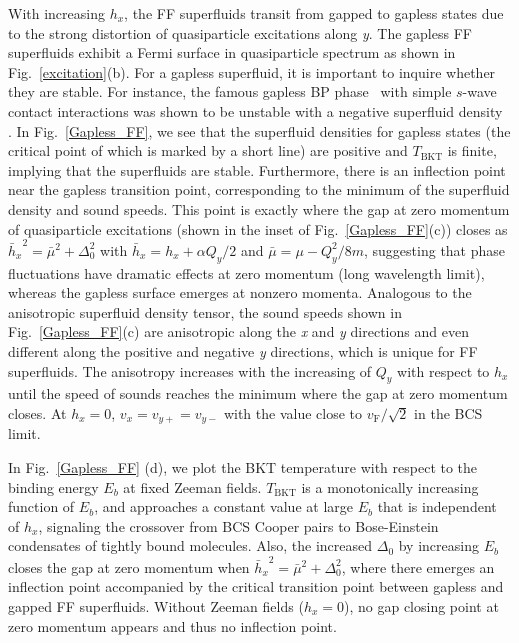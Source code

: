 \documentclass[prl,aps,twocolumn,showpacs, floatfix]{revtex4}
\begin{document}
With increasing $h_{x}$, the FF superfluids transit from gapped to gapless
states \cite%
{FanWu2013PRL,LinDongArx,Yong2014PRL,MGong2014PRB,YGao2014arXiv,Hu2014arXiv}
due to the strong distortion of quasiparticle excitations along \textit{y}.
The gapless FF superfluids exhibit a Fermi surface in quasiparticle spectrum
as shown in Fig.~\ref{excitation}(b). For a gapless superfluid, it is
important to inquire whether they are stable. For instance, the famous
gapless BP phase~\cite{Vincent2003PRL} with simple $s$-wave contact
interactions was shown to be unstable with a negative superfluid density~%
\cite{Yip2003PRA, Vincent2005PRL}. In Fig.~\ref{Gapless_FF}, we see that the
superfluid densities for gapless states (the critical point of which is
marked by a short line) are positive and $T_{\mathrm{BKT}}$ is finite,
implying that the superfluids are stable. Furthermore, there is an
inflection point near the gapless transition point, corresponding to the
minimum of the superfluid density and sound speeds. This point is exactly
where the gap at zero momentum of quasiparticle excitations (shown in the
inset of Fig.~\ref{Gapless_FF}(c)) closes as ${\bar{h}_{x}}^{2}={\bar{\mu}}%
^{2}+\Delta _{0}^{2}$ with $\bar{h}_{x}=h_{x}+\alpha Q_{y}/2$ and $\bar{\mu}%
=\mu -Q_{y}^{2}/8m$, suggesting that phase fluctuations have dramatic
effects at zero momentum (long wavelength limit), whereas the gapless
surface emerges at nonzero momenta. Analogous to the anisotropic superfluid
density tensor, the sound speeds shown in Fig.~\ref{Gapless_FF}(c) are
anisotropic along the \textit{x} and \textit{y} directions and even
different along the positive and negative \textit{y} directions, which is
unique for FF superfluids. The anisotropy increases with the increasing of $%
Q_{y}$ with respect to $h_{x}$ until the speed of sounds reaches the minimum
where the gap at zero momentum closes. At $h_{x}=0$, $v_{x}=v_{y+}=v_{y-}$
with the value close to $v_{\mathrm{F}}/\sqrt{2}$ in the BCS limit.

In Fig.~\ref{Gapless_FF} (d), we plot the BKT temperature with respect to
the binding energy $E_{b}$ at fixed Zeeman fields. $T_{\mathrm{BKT}}$ is a
monotonically increasing function of $E_{b}$, and approaches a constant
value at large $E_{b}$ that is independent of $h_{x}$, signaling the
crossover from BCS Cooper pairs to Bose-Einstein condensates of tightly
bound molecules. Also, the increased $\Delta_0$ by increasing $E_b$ closes
the gap at zero momentum when ${\bar{h}_x}^2={\bar\mu}^2+\Delta_0^2$, where
there emerges an inflection point accompanied by the critical transition
point between gapless and gapped FF superfluids. Without Zeeman fields ($%
h_x=0$), no gap closing point at zero momentum appears and thus no
inflection point.
\end{document}
